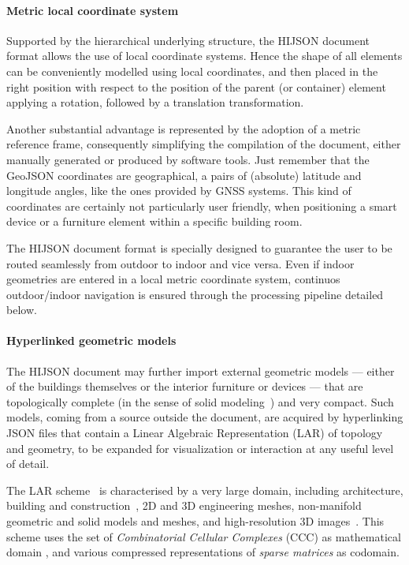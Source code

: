 \paragraph*{Metric local coordinate system}\label{metric-local-coordinate-system}

Supported by the hierarchical underlying structure, the HIJSON document format allows 
the use of local coordinate systems. Hence the shape of all elements can 
be conveniently modelled using local coordinates, and then placed in the right position 
with respect to the position of the parent (or container) element applying a rotation, followed by a
translation transformation.

Another substantial advantage is represented by the adoption of a metric
reference frame,  consequently simplifying the compilation of the document,
either manually generated or produced by software tools. Just remember that
the GeoJSON coordinates are geographical, a pairs of (absolute) latitude
and longitude angles, like the ones provided by GNSS systems. This kind of
coordinates  are certainly not particularly user friendly, when positioning a
smart device or a furniture element within a specific building room.

The HIJSON document format is specially designed to guarantee the user to be routed seamlessly 
from outdoor to indoor and vice versa. Even if indoor geometries are entered in a local metric 
coordinate system, continuos outdoor/indoor navigation is ensured through the processing pipeline
detailed below.

\paragraph*{Hyperlinked geometric models}\label{optional-lar}

The HIJSON document may further import external geometric models --- either of the buildings themselves or the interior furniture or devices --- that are topologically complete (in the sense of solid modeling~\cite{Requicha:1980:RRS:356827.356833}) and very compact. 
Such models, coming from a source outside the document, are acquired by hyperlinking JSON files that contain a Linear Algebraic Representation (LAR) of topology and geometry, to be expanded for visualization or interaction at any useful level of detail. 

The LAR scheme~\cite{Dicarlo:2014:TNL:2543138.2543294} is characterised by a very large domain, including architecture, building and construction~\cite{paoluzziMS:2014}, 2D and 3D engineering meshes, non-manifold geometric and solid models and meshes, and high-resolution 3D images~\cite{cadanda:2015}. This scheme uses the set of \emph{Combinatorial Cellular Complexes} (CCC) as mathematical domain
\cite{Basak:2010}, and various compressed representations of \emph{sparse matrices} \cite{gemmexp} as codomain. 

